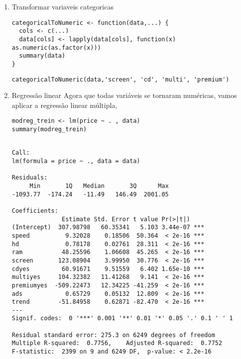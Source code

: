 \documentclass[11pt]{article}
\begin{document}
\begin{enumerate}
\item Transformar variaveis categoricas
\label{sec:org3a5f154}
\begin{verbatim}
categoricalToNumeric <- function(data,...) {
  cols <- c(...)
  data[cols] <- lapply(data[cols], function(x) as.numeric(as.factor(x)))
  summary(data)
}
\end{verbatim}

\begin{verbatim}
categoricalToNumeric(data,'screen', 'cd', 'multi', 'premium')
\end{verbatim}


\item Regressão linear
\label{sec:orgdb9d09f}
Agora que todas variáveis se tornaram numéricas, vamos aplicar a regressão linear múltipla,

\begin{verbatim}
modreg_trein <- lm(price ~ . , data)
summary(modreg_trein)
\end{verbatim}

\begin{verbatim}

Call:
lm(formula = price ~ ., data = data)

Residuals:
     Min       1Q   Median       3Q      Max 
-1093.77  -174.24   -11.49   146.49  2001.05 

Coefficients:
              Estimate Std. Error t value Pr(>|t|)    
(Intercept)  307.98798   60.35341   5.103 3.44e-07 ***
speed          9.32028    0.18506  50.364  < 2e-16 ***
hd             0.78178    0.02761  28.311  < 2e-16 ***
ram           48.25596    1.06608  45.265  < 2e-16 ***
screen       123.08904    3.99950  30.776  < 2e-16 ***
cdyes         60.91671    9.51559   6.402 1.65e-10 ***
multiyes     104.32382   11.41268   9.141  < 2e-16 ***
premiumyes  -509.22473   12.34225 -41.259  < 2e-16 ***
ads            0.65729    0.05132  12.809  < 2e-16 ***
trend        -51.84958    0.62871 -82.470  < 2e-16 ***
---
Signif. codes:  0 '***' 0.001 '**' 0.01 '*' 0.05 '.' 0.1 ' ' 1

Residual standard error: 275.3 on 6249 degrees of freedom
Multiple R-squared:  0.7756,	Adjusted R-squared:  0.7752 
F-statistic:  2399 on 9 and 6249 DF,  p-value: < 2.2e-16


\end{verbatim}
\end{enumerate}
\end{document}
